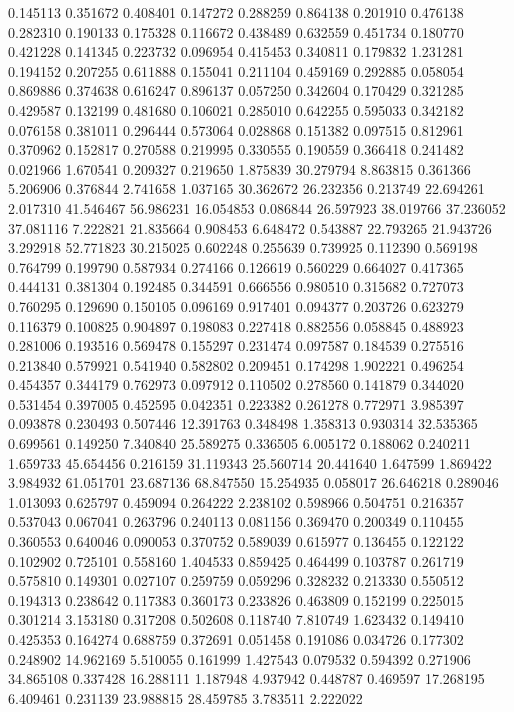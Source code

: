 0.145113
0.351672
0.408401
0.147272
0.288259
0.864138
0.201910
0.476138
0.282310
0.190133
0.175328
0.116672
0.438489
0.632559
0.451734
0.180770
0.421228
0.141345
0.223732
0.096954
0.415453
0.340811
0.179832
1.231281
0.194152
0.207255
0.611888
0.155041
0.211104
0.459169
0.292885
0.058054
0.869886
0.374638
0.616247
0.896137
0.057250
0.342604
0.170429
0.321285
0.429587
0.132199
0.481680
0.106021
0.285010
0.642255
0.595033
0.342182
0.076158
0.381011
0.296444
0.573064
0.028868
0.151382
0.097515
0.812961
0.370962
0.152817
0.270588
0.219995
0.330555
0.190559
0.366418
0.241482
0.021966
1.670541
0.209327
0.219650
1.875839
30.279794
8.863815
0.361366
5.206906
0.376844
2.741658
1.037165
30.362672
26.232356
0.213749
22.694261
2.017310
41.546467
56.986231
16.054853
0.086844
26.597923
38.019766
37.236052
37.081116
7.222821
21.835664
0.908453
6.648472
0.543887
22.793265
21.943726
3.292918
52.771823
30.215025
0.602248
0.255639
0.739925
0.112390
0.569198
0.764799
0.199790
0.587934
0.274166
0.126619
0.560229
0.664027
0.417365
0.444131
0.381304
0.192485
0.344591
0.666556
0.980510
0.315682
0.727073
0.760295
0.129690
0.150105
0.096169
0.917401
0.094377
0.203726
0.623279
0.116379
0.100825
0.904897
0.198083
0.227418
0.882556
0.058845
0.488923
0.281006
0.193516
0.569478
0.155297
0.231474
0.097587
0.184539
0.275516
0.213840
0.579921
0.541940
0.582802
0.209451
0.174298
1.902221
0.496254
0.454357
0.344179
0.762973
0.097912
0.110502
0.278560
0.141879
0.344020
0.531454
0.397005
0.452595
0.042351
0.223382
0.261278
0.772971
3.985397
0.093878
0.230493
0.507446
12.391763
0.348498
1.358313
0.930314
32.535365
0.699561
0.149250
7.340840
25.589275
0.336505
6.005172
0.188062
0.240211
1.659733
45.654456
0.216159
31.119343
25.560714
20.441640
1.647599
1.869422
3.984932
61.051701
23.687136
68.847550
15.254935
0.058017
26.646218
0.289046
1.013093
0.625797
0.459094
0.264222
2.238102
0.598966
0.504751
0.216357
0.537043
0.067041
0.263796
0.240113
0.081156
0.369470
0.200349
0.110455
0.360553
0.640046
0.090053
0.370752
0.589039
0.615977
0.136455
0.122122
0.102902
0.725101
0.558160
1.404533
0.859425
0.464499
0.103787
0.261719
0.575810
0.149301
0.027107
0.259759
0.059296
0.328232
0.213330
0.550512
0.194313
0.238642
0.117383
0.360173
0.233826
0.463809
0.152199
0.225015
0.301214
3.153180
0.317208
0.502608
0.118740
7.810749
1.623432
0.149410
0.425353
0.164274
0.688759
0.372691
0.051458
0.191086
0.034726
0.177302
0.248902
14.962169
5.510055
0.161999
1.427543
0.079532
0.594392
0.271906
34.865108
0.337428
16.288111
1.187948
4.937942
0.448787
0.469597
17.268195
6.409461
0.231139
23.988815
28.459785
3.783511
2.222022
